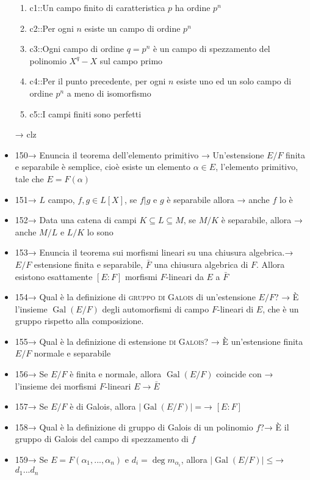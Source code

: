 \documentclass[A4,12pt]{article}
\renewcommand{\subset}{\subseteq}
\begin{document}
\begin{itemize}[noitemsep]
\begin{enumerate}
			\item {{c1::Un campo finito di caratteristica $ p $ ha ordine $ p^n $}}
			\item {{c2::Per ogni $ n $ esiste un campo di ordine $ p^n $}}
			\item {{c3::Ogni campo di ordine $ q= p^n $ è un campo di spezzamento del polinomio $ X^q-X $ sul campo primo}}
			\item {{c4::Per il punto precedente, per ogni $ n $ esiste uno ed un solo campo di ordine $ p^n $ a meno di isomorfismo}}
			\item {{c5::I campi finiti sono perfetti}}
		\end{enumerate}→ clz
		\item 150→ Enuncia il teorema dell'elemento primitivo → Un'estensione $ E/F $ finita e separabile è semplice, cioè esiste un elemento $ \alpha \in E $, l'elemento primitivo, tale che $ E=F(\alpha) $
		\item 151→ $ L $ campo, $ f,g\in L[X] $, se $ f|g $ e $ g $ è separabile allora → anche $ f $ lo è
		\item 152→ Data una catena di campi $ K\subset L\subset M $, se $ M/K $ è separabile, allora → anche $ M/L $ e $ L/K $ lo sono
		\item 153→ Enuncia il teorema sui morfismi lineari su una chiusura algebrica.→ $ E/F $ estensione finita e separabile, $ \bar F $ una chiusura algebrica di $ F $. Allora esistono esattamente $ [E:F] $ morfismi $ F $-lineari da $ E $ a $ \bar F $
		\item 154→ Qual è la definizione di \textsc{gruppo di Galois} di un'estensione $ E/F $? → È l'insieme $ \operatorname{Gal}(E/F) $ degli automorfismi di campo $ F $-lineari di $ E $, che è un gruppo rispetto alla composizione.
		\item 155→ Qual è la definizione di estensione \textsc{di Galois}? → È un'estensione finita $ E/F $ normale e separabile
		\item 156→ Se $ E/F $ è finita e normale, allora $ \operatorname{Gal}(E/F) $ coincide con → l'insieme dei morfismi $ F $-lineari $ E\to \bar E $
		\item 157→ Se $ E/F $ è di Galois, allora $ |\operatorname{Gal}(E/F)| = $→ $ [E:F]  $
		\item 158→ Qual è la definizione di gruppo di Galois di un polinomio $ f $?→	
		È il gruppo di Galois del campo di spezzamento di $ f $
		\item 159→ Se $ E=F(\alpha_1,...,\alpha_n) $ e $ d_i=\deg m_{\alpha_i} $, allora $ |\operatorname{Gal}(E/F)|\leq $→ $ d_1...d_n $ 

\end{itemize}
\end{document}
